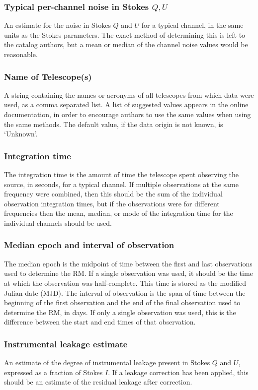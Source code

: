 \documentclass[10pt,modern]{aastex63}
\begin{document}
\subsubsection{Typical per-channel noise in Stokes $Q,U$}
An estimate for the noise in Stokes $Q$ and $U$ for a typical channel, in the same units as the Stokes parameters. The exact method of determining this is left to the catalog authors, but a mean or median of the channel noise values would be reasonable.

\subsubsection{Name of Telescope(s)}
A string containing the names or acronyms of all telescopes from which data were used, as a comma separated list. A list of suggested values appears in the online documentation, in order to encourage authors to use the same values when using the same methods. The default value, if the data origin is not known, is `Unknown'.

\subsubsection{Integration time}
The integration time is the amount of time the telescope spent observing the source, in seconds, for a typical channel. If multiple observations at the same frequency were combined, then this should be the sum of the individual observation integration times, but if the observations were for different frequencies then the mean, median, or mode of the integration time for the individual channels should be used.

\subsubsection{Median epoch and interval of observation}
The median epoch is the midpoint of time between the first and last observations used to determine the RM. If a single observation was used, it should be the time at which the observation was half-complete. This time is stored as the modified Julian date (MJD). The interval of observation is the span of time between the beginning of the first observation and the end of the final observation used to determine the RM, in days. If only a single observation was used, this is the difference between the start and end times of that observation.

\subsubsection{Instrumental leakage estimate}
An estimate of the degree of instrumental leakage present in Stokes $Q$ and $U$, expressed as a fraction of Stokes $I$. If a leakage correction has been applied, this should be an estimate of the residual leakage after correction.
\end{document}
